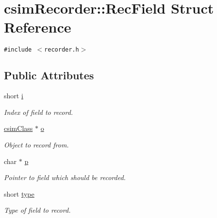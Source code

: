 \hypertarget{structcsimRecorder_1_1RecField}{
\section{csim\-Recorder::Rec\-Field Struct Reference}
\label{structcsimRecorder_1_1RecField}
}
{\tt \#include $<$recorder.h$>$}

\subsection*{Public Attributes}
\begin{CompactItemize}
\item 
\hypertarget{structcsimRecorder_1_1RecField_o0}{
short \hyperlink{structcsimRecorder_1_1RecField_o0}{i}}
\label{structcsimRecorder_1_1RecField_o0}

\begin{CompactList}\small\item\em Index of field to record. \item\end{CompactList}\item 
\hypertarget{structcsimRecorder_1_1RecField_o1}{
\hyperlink{classcsimClass}{csim\-Class} $\ast$ \hyperlink{structcsimRecorder_1_1RecField_o1}{o}}
\label{structcsimRecorder_1_1RecField_o1}

\begin{CompactList}\small\item\em Object to record from. \item\end{CompactList}\item 
\hypertarget{structcsimRecorder_1_1RecField_o2}{
char $\ast$ \hyperlink{structcsimRecorder_1_1RecField_o2}{p}}
\label{structcsimRecorder_1_1RecField_o2}

\begin{CompactList}\small\item\em Pointer to field which should be recorded. \item\end{CompactList}\item 
\hypertarget{structcsimRecorder_1_1RecField_o3}{
short \hyperlink{structcsimRecorder_1_1RecField_o3}{type}}
\label{structcsimRecorder_1_1RecField_o3}

\begin{CompactList}\small\item\em Type of field to record. \item\end{CompactList}\end{CompactItemize}
